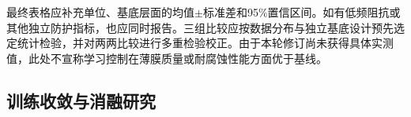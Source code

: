 最终表格应补充单位、基底层面的均值$\pm$标准差和95\%置信区间。如有低频阻抗或其他独立防护指标，也应同时报告。三组比较应按数据分布与独立基底设计预先选定统计检验，并对两两比较进行多重检验校正。由于本轮修订尚未获得具体实测值，此处不宣称学习控制在薄膜质量或耐腐蚀性能方面优于基线。





\subsection{训练收敛与消融研究}
\label{subsec:exp_training_ablation}






